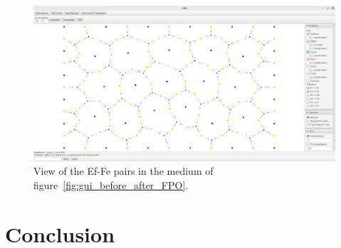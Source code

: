 \documentclass{article}
\begin{document}
\begin{figure}[h]
	\centering\includegraphics[width=0.8\linewidth]{assets/EfFe_transfers.png}
	\caption{View of the Ef-Fe pairs in the medium of figure~\ref{fig:gui_before_after_FPO}.}
	\label{fig:gui_EfFe}
\end{figure}

\section*{Conclusion}
\label{conclusion}

\printbibliography[heading=bibintoc]
\end{document}
